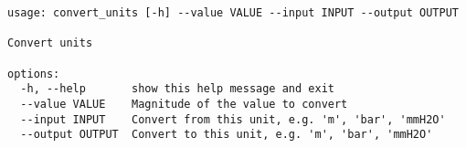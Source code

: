 \begin{code}
\label{code:units}
\begin{verbatim}
usage: convert_units [-h] --value VALUE --input INPUT --output OUTPUT

Convert units

options:
  -h, --help       show this help message and exit
  --value VALUE    Magnitude of the value to convert
  --input INPUT    Convert from this unit, e.g. 'm', 'bar', 'mmH2O'
  --output OUTPUT  Convert to this unit, e.g. 'm', 'bar', 'mmH2O'
\end{verbatim}
\end{code}
